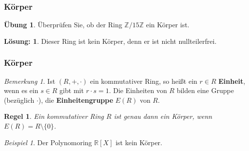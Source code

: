 \documentclass[hyperref={pdfpagelabels=false}]{beamer}
\theoremstyle{plain}%
\newtheorem*{regel}{Regel}
\theoremstyle{definition}
\newtheorem*{uebung}{Übung}
\newtheorem*{sol}{Lösung:}
\theoremstyle{remark}
\newtheorem*{beispiel}{Beispiel}
\newtheorem*{notiz}{Bemerkung}
\def \R{\mathbb R}
\def \Z{\mathbb Z}
\begin{document}
\begin{frame}
\frametitle{Körper}
\begin{uebung} Überprüfen Sie, ob der Ring $\Z/15\Z$ ein Körper ist.
\end{uebung}

\pause \pause 

\bigbreak

\begin{sol} Dieser Ring ist kein Körper, denn er ist nicht nullteilerfrei.
\end{sol}

\end{frame}


\begin{frame}
\frametitle{Körper}

\begin{notiz} Ist $(R, +, \cdot)$ ein kommutativer Ring, so heißt ein 
$r \in R$  \textbf{Einheit}, wenn es ein $s \in R$ gibt mit $r \cdot s = 1$. Die Einheiten von $R$ bilden 
eine Gruppe (bezüglich $\cdot$), die \textbf{Einheitengruppe} $E(R)$ von $R$. 
\end{notiz}

\pause 

\begin{regel}
Ein kommutativer Ring $R$ ist genau dann ein Körper, wenn $E(R) = R \setminus \{0 \}$.
\end{regel}

\pause 

\begin{beispiel}
Der Polynomoring $\R[X]$ ist kein Körper.
\end{beispiel}

\end{frame}
\end{document}
